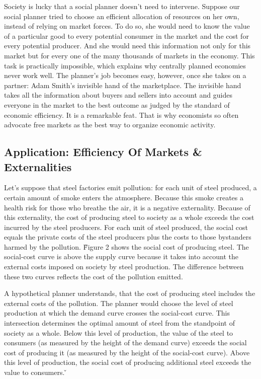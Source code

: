 Society is lucky that a social planner doesn't need to intervene. Suppose our social planner tried to choose an
efficient allocation of resources on her own, instead of relying on market forces. To do so, she would need to know
the value of a particular good to every potential consumer in the market and the cost for every potential producer.
And she would need this information not only for this market but for every one of the many thousands of markets in
the economy. This task is practically impossible, which explains why centrally planned economies never work well. The
planner's job becomes easy, however, once she takes on a partner: Adam Smith's invisible hand of the marketplace. The
invisible hand takes all the information about buyers and sellers into account and guides everyone in the market to
the best outcome as judged by the standard of economic efficiency. It is a remarkable feat. That is why economists so
often advocate free markets as the best way to organize economic activity.

\subsection{Application: Efficiency Of Markets \& Externalities}

Let's suppose that steel factories emit pollution: for each unit of steel produced, a certain amount of smoke enters
the atmosphere. Because this smoke creates a health risk for those who breathe the air, it is a negative externality.
Because of this externality, the cost of producing steel to society as a whole exceeds the cost incurred by the steel
producers. For each unit of steel produced, the social cost equals the private costs of the steel producers plus the
costs to those bystanders harmed by the pollution. \v

Figure 2 shows the social cost of producing steel. The social-cost curve is above the supply curve because it takes
into account the external costs imposed on society by steel production. The difference between these two curves
reflects the cost of the pollution emitted.


A hypothetical planner understands, that the cost of producing steel includes the external costs of the pollution.
The planner would choose the level of steel production at which the demand curve crosses the social-cost curve. This
intersection determines the optimal amount of steel from the standpoint of society as a whole. Below this level of
production, the value of the steel to consumers (as measured by the height of the demand curve) exceeds the social
cost of producing it (as measured by the height of the social-cost curve). Above this level of production, the social
cost of producing additional steel exceeds the value to consumers. \v

